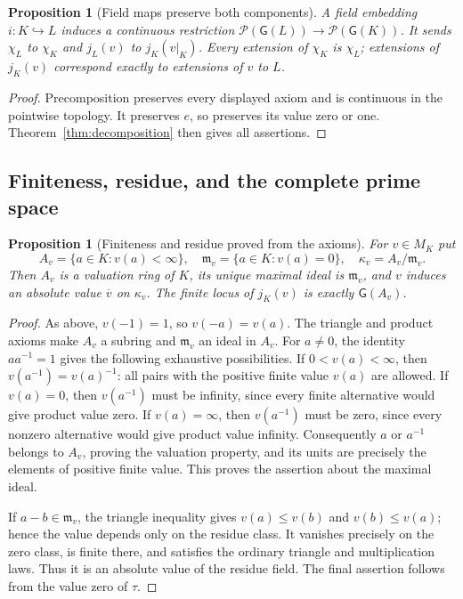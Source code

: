 \documentclass[11pt,a4paper]{article}
\newtheorem{proposition}[theorem]{Proposition}
\theoremstyle{definition}\newtheorem{definition}[theorem]{Definition}
\newcommand{\G}{\mathsf G}\newcommand{\Tor}{\operatorname{Tor}}\newcommand{\Frac}{\operatorname{Frac}}
\begin{document}
\begin{proposition}[Field maps preserve both components]\label{prop:fieldfunctor}
A field embedding $i:K\hookrightarrow L$ induces a continuous restriction
$\mathcal P(\G(L))\to\mathcal P(\G(K))$. It sends $\chi_L$ to $\chi_K$
and $j_L(v)$ to $j_K(v|_K)$. Every extension of $\chi_K$ is $\chi_L$;
extensions of $j_K(v)$ correspond exactly to extensions of $v$ to $L$.
\end{proposition}
\begin{proof}
Precomposition preserves every displayed axiom and is continuous in
the pointwise topology. It preserves $e$, so preserves its value zero
or one. Theorem~\ref{thm:decomposition} then gives all assertions.
\end{proof}

\subsection{Finiteness, residue, and the complete prime space}

\begin{proposition}[Finiteness and residue proved from the axioms]
\label{prop:finite}
For $v\in M_K$ put
\[
 A_v=\{a\in K:v(a)<\infty\},\quad
 \mathfrak m_v=\{a\in K:v(a)=0\},\quad
 \kappa_v=A_v/\mathfrak m_v.
\]
Then $A_v$ is a valuation ring of $K$, its unique maximal ideal is
$\mathfrak m_v$, and $v$ induces an absolute value $\overline v$ on
$\kappa_v$. The finite locus of $j_K(v)$ is exactly $\G(A_v)$.
\end{proposition}
\begin{proof}
As above, $v(-1)=1$, so $v(-a)=v(a)$. The triangle and product axioms
make $A_v$ a subring and $\mathfrak m_v$ an ideal in $A_v$.
For $a\ne0$, the identity $aa^{-1}=1$ gives the following exhaustive
possibilities. If $0<v(a)<\infty$, then $v(a^{-1})=v(a)^{-1}$:
all pairs with the positive finite value $v(a)$ are allowed. If $v(a)=0$,
then $v(a^{-1})$ must be infinity, since every finite alternative would
give product value zero. If $v(a)=\infty$, then $v(a^{-1})$ must be zero,
since every nonzero alternative would give product value infinity.
Consequently $a$ or $a^{-1}$ belongs to $A_v$, proving the valuation
property, and its units are precisely the elements of positive finite
value. This proves the assertion about the maximal ideal.

If $a-b\in\mathfrak m_v$, the triangle inequality gives $v(a)\le v(b)$
and $v(b)\le v(a)$; hence the value depends only on the residue class.
It vanishes precisely on the zero class, is finite there, and satisfies
the ordinary triangle and multiplication laws. Thus it is an absolute
value of the residue field. The final assertion follows from the value
zero of $\tau$.
\end{proof}
\end{document}
